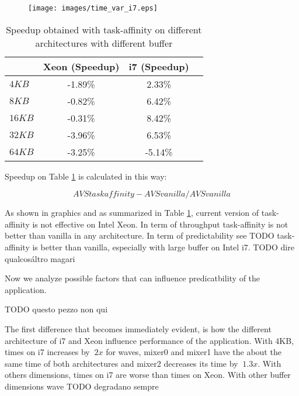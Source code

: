 \begin{figure}[htbp]
\centering
\texttt{[image: images/time\_var\_i7.eps]}
\caption{}
\label{fig:var_xeon}
\end{figure}

\begin{table}[htbp]
\begin{center}
\begin{tabular}{l|c|c|c}
	\hline
	& Xeon (Speedup) & i7 (Speedup) \\ \hline
	$4KB$  & -1.89\% & 2.33\% \\ \hline
	$8KB$  & -0.82\% & 6.42\% \\ \hline
	$16KB$ & -0.31\% & 8.42\% \\ \hline
	$32KB$ & -3.96\% & 6.53\% \\ \hline
	$64KB$ & -3.25\% & -5.14\% \\ \hline
	\hline
\end{tabular}
\caption{Speedup obtained with task-affinity on different architectures with different buffer}
\label{tab:speedup_xeon_i7}
\end{center}
\end{table}

Speedup on Table \ref{tab:speedup_xeon_i7} is calculated in this way:

\begin{equation}
        AVS taskaffinity - AVS vanilla / AVS vanilla
\label{eq:miss_rate}
\end{equation}

As shown in graphics and as summarized in Table \ref{tab:speedup_xeon_i7}, current version of task-affinity is not effective on Intel Xeon. 
In term of throughput task-affinity is not better than vanilla in any architecture. In term of predictability see TODO task-affinity is better than vanilla,
especially with large buffer on Intel i7.
TODO dire qualcos\'altro magari

Now we analyze possible factors that can influence predicatbility of the application.


TODO questo pezzo non qui

The first difference that becomes immediately evident, is how the different architecture of i7 and Xeon influence performance of the application.
With 4KB, times on i7 increases by $~ 2x$ for waves, mixer0 and mixer1 have the about the same time of both architectures and mixer2 decreases its time by 
$~ 1.3x$. With others dimensions, times on i7 are worse than times on Xeon. With other buffer dimensions wave TODO degradano sempre

